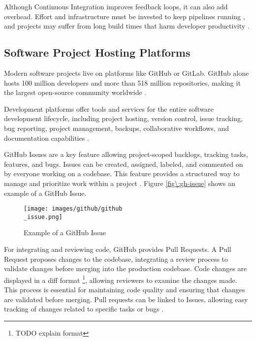 Although Continuous Integration improves feedback loops, it can also add overhead. Effort and infrastructure must be invested to keep pipelines running \cite{hiltonUsageCostsBenefits2016}, and projects may suffer from long build times that harm developer productivity \cite{ghalebEmpiricalStudyLong2019}.

\subsection{Software Project Hosting Platforms} \label{subsection\:Software Project Hosting Platforms}

Modern software projects live on platforms like GitHub or GitLab. GitHub alone hosts 100 million developers and more than 518 million repositories, making it the largest open-source community worldwide \cite{staffOctoverseAILeads2024}.

Development platforms offer tools and services for the entire software development lifecycle, including project hosting, version control, issue tracking, bug reporting, project management, backups, collaborative workflows, and documentation capabilities \cite{GitHubFeatures2025, abrahamssonAgileSoftwareDevelopment2017}.

GitHub Issues are a key feature allowing project-scoped backlogs, tracking tasks, features, and bugs. Issues can be created, assigned, labeled, and commented on by everyone working on a codebase. This feature provides a structured way to manage and prioritize work within a project \cite{Issues}. Figure \ref{fig\:gh-issue} shows an example of a GitHub Issue.

\begin{figure}[H]
    \centering
    \texttt{[image: images/github/github\\\_issue.png]}
    \caption{Example of a GitHub Issue}
    \label{fig:gh-issue}
\end{figure}

For integrating and reviewing code, GitHub provides Pull Requests. A Pull Request proposes changes to the codebase, integrating a review process to validate changes before merging into the production codebase. Code changes are displayed in a diff format \footnote{TODO explain format}, allowing reviewers to examine the changes made. This process is essential for maintaining code quality and ensuring that changes are validated before merging. Pull requests can be linked to Issues, allowing easy tracking of changes related to specific tasks or bugs \cite{PullRequests}.

